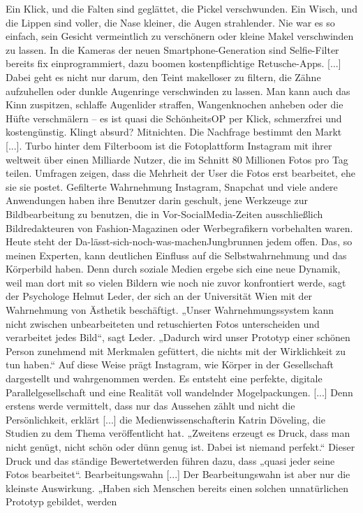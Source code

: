 Ein Klick, und die Falten sind
geglättet, die Pickel verschwunden. Ein Wisch, und die Lippen
sind voller, die Nase kleiner, die
Augen strahlender.
Nie war es so einfach, sein Gesicht
vermeintlich zu verschönern oder
kleine Makel verschwinden zu
lassen. In die Kameras der neuen
Smartphone-Generation sind
Selfie-Filter bereits fix einprogrammiert, dazu boomen kostenpflichtige Retusche-Apps. [...]
Dabei geht es nicht nur darum,
den Teint makelloser zu filtern, die
Zähne aufzuhellen oder dunkle
Augenringe verschwinden zu lassen. Man kann auch das Kinn
zuspitzen, schlaffe Augenlider
straffen, Wangenknochen anheben oder die Hüfte verschmälern – es ist quasi die SchönheitsOP per Klick, schmerzfrei und
kostengünstig.
Klingt absurd? Mitnichten. Die
Nachfrage bestimmt den Markt
[...]. Turbo hinter dem Filterboom ist die Fotoplattform Instagram mit ihrer weltweit über
einen Milliarde Nutzer, die im
Schnitt 80  Millionen Fotos pro
Tag teilen. Umfragen zeigen, dass
die Mehrheit der User die Fotos
erst bearbeitet, ehe sie sie postet.
Gefilterte Wahrnehmung
Instagram, Snapchat und viele
andere Anwendungen haben ihre
Benutzer darin geschult, jene
Werkzeuge zur Bildbearbeitung
zu benutzen, die in Vor-SocialMedia-Zeiten ausschließlich Bildredakteuren von Fashion-Magazinen oder Werbegrafikern vorbehalten waren. Heute steht der
Da-lässt-sich-noch-was-machenJungbrunnen jedem offen.
Das, so meinen Experten, kann
deutlichen Einfluss auf die Selbstwahrnehmung und das Körperbild haben. Denn durch soziale
Medien ergebe sich eine neue
Dynamik, weil man dort mit so
vielen Bildern wie noch nie zuvor
konfrontiert werde, sagt der Psychologe Helmut Leder, der sich
an der Universität Wien mit
der Wahrnehmung von Ästhetik beschäftigt. „Unser Wahrnehmungssystem kann nicht
zwischen unbearbeiteten und
retuschierten Fotos unterscheiden und verarbeitet jedes Bild“,
sagt Leder. „Dadurch wird unser
Prototyp einer schönen Person zunehmend mit Merkmalen
gefüttert, die nichts mit der Wirklichkeit zu tun haben.“
Auf diese Weise prägt Instagram,
wie Körper in der Gesellschaft
dargestellt und wahrgenommen
werden. Es entsteht eine perfekte, digitale Parallelgesellschaft
und eine Realität voll wandelnder
Mogelpackungen. [...]
Denn erstens werde vermittelt,
dass nur das Aussehen zählt und
nicht die Persönlichkeit, erklärt
[...] die Medienwissenschafterin Katrin Döveling, die Studien
zu dem Thema veröffentlicht hat.
„Zweitens erzeugt es Druck, dass
man nicht genügt, nicht schön
oder dünn genug ist. Dabei ist
niemand perfekt.“ Dieser Druck
und das ständige Bewertetwerden
führen dazu, dass „quasi jeder
seine Fotos bearbeitet“.
Bearbeitungswahn
[...] Der Bearbeitungswahn ist
aber nur die kleinste Auswirkung. „Haben sich Menschen
bereits einen solchen unnatürlichen Prototyp gebildet, werden

